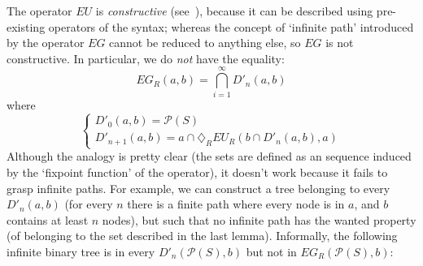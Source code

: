 \documentclass[11pt]{article}
\newcommand{\dia}{{\diamondsuit}}
\theoremstyle{definition}
\begin{document}
The operator $EU$ is \emph{constructive} (see~\cite[Intro]{SantoMu}), because it can be described using pre-existing operators of the syntax; whereas the concept of `infinite path' introduced by the operator $EG$ cannot be reduced to anything else, so $EG$ is not constructive. In particular, we do \emph{not} have the equality: \[EG_R(a,b)=\bigcap_{i=1}^\infty D'_n(a,b)\] where
\begin{equation*}
    \begin{cases}
        D'_0(a,b)=\mathcal{P}(S)\\
        D'_{n+1}(a,b)=a\cap\dia_R EU_R(b\cap D'_n(a,b),a)
    \end{cases}
\end{equation*}
Although the analogy is pretty clear (the sets are defined as an sequence induced by the `fixpoint function' of the operator), 
it doesn't work because it fails to grasp infinite paths. For example, we can construct a tree belonging to every $D'_n(a,b)$ 
(for every $n$ there is a finite path where every node is in $a$, and $b$ contains at least $n$ nodes), but such that no infinite 
path has the wanted property (of belonging to the set described in the last lemma). 
Informally, the following infinite binary tree is in every $D'_n(\mathcal{P}(S),b)$ but not in $EG_R(\mathcal{P}(S),b)$:
\begin{center} 
\end{center}
\end{document}
